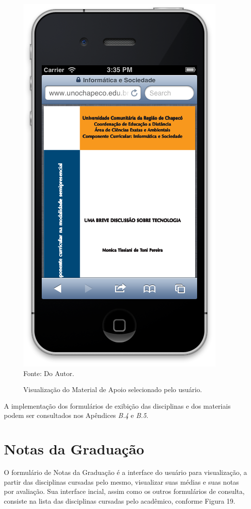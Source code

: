 \begin{figure}[!htb]
     \centering
     \caption[Formulário Material de Apoio - Visualização de Material]{Visualização do Material de Apoio selecionado pelo usuário.}
     \includegraphics[scale=0.34]{imagens/visualizacaomaterialapoio.png}
     \\  Fonte: Do Autor.
\end{figure}
\newpage

A implementação dos formulários de exibição das disciplinas e dos materiais podem ser consultados nos Apêndices \emph{B.4} e \emph{B.5}.

\section{Notas da Graduação}
O formulário de Notas da Graduação é a interface do usuário para visualização, a partir das disciplinas cursadas pelo mesmo, visualizar suas médias e suas notas por avaliação. Sua interface incial, assim como os outros formulários de consulta, consiste na lista das disciplinas cursadas pelo acadêmico, conforme Figura 19.

